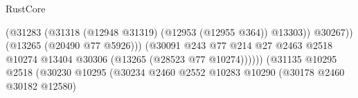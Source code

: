 \begin{lexlean}{RustCore}
\begin{coremodule}
                                                                              (@31283
                                                                                (@31318
                                                                                  (@12948 @31319)
                                                                                  (@12953
                                                                                    (@12955 @364))
                                                                                  @13303))
                                                                              @30267))
                                                                          (@13265
                                                                            (@20490 @77 @5926)))
                                                                        (@30091
                                                                          @243
                                                                          @77
                                                                          @214
                                                                          @27
                                                                          @2463
                                                                          @2518
                                                                          @10274
                                                                          @13404
                                                                          @30306
                                                                          (@13265
                                                                            (@28523 @77 @10274))))))
                                                                  (@31135
                                                                    @10295
                                                                    @2518
                                                                    (@30230
                                                                      @10295
                                                                      (@30234
                                                                        @2460
                                                                        @2552
                                                                        @10283
                                                                        @10290
                                                                        (@30178 @2460 @30182 @12580)

\end{coremodule}
\end{lexlean}
